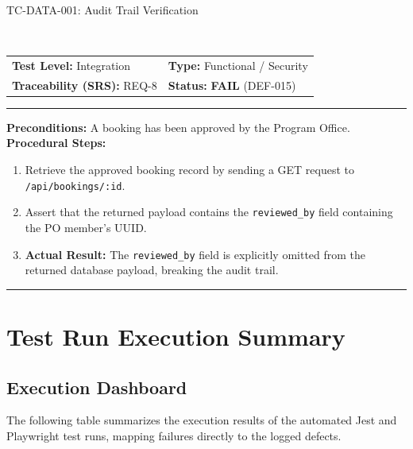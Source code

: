 \documentclass[11pt,a4paper]{article}
\makeatletter
\newcommand{\ieeetestcase}[8]{%
    \needspace{8\baselineskip}
    \noindent\colorbox{primaryblue}{\parbox{\dimexpr\textwidth-2\fboxsep\relax}{
        \color{white}\bfseries\large\strut #1: #2
    }}
    \nopagebreak\\
    \noindent\begin{tabularx}{\textwidth}{@{}X X@{}}
        \textbf{Test Level:} #3 & \textbf{Type:} #4 \\
        \textbf{Traceability (SRS):} #5 & \textbf{Status:} #6 \\
    \end{tabularx}
    \nopagebreak\vspace{0.1cm}
    \nopagebreak\hrule\vspace{0.2cm}
    \noindent\textbf{Preconditions:} #7 \\
    \noindent\textbf{Procedural Steps:}
    \begin{enumerate}[noitemsep,topsep=1pt,leftmargin=0.5cm]
        #8
    \end{enumerate}
    \vspace{0.4cm}\hrule\vspace{0.4cm}
}
\makeatother
\begin{document}
\ieeetestcase{TC-DATA-001}{Audit Trail Verification}{Integration}{Functional / Security}{REQ-8}{\textbf{FAIL} (DEF-015)}{A booking has been approved by the Program Office.}{
    \item Retrieve the approved booking record by sending a GET request to \texttt{/api/bookings/:id}.
    \item Assert that the returned payload contains the \texttt{reviewed\_by} field containing the PO member's UUID.
    \item \textbf{Actual Result:} The \texttt{reviewed\_by} field is explicitly omitted from the returned database payload, breaking the audit trail.
}

\newpage
\section{Test Run Execution Summary}

\subsection{Execution Dashboard}
The following table summarizes the execution results of the automated Jest and Playwright test runs, mapping failures directly to the logged defects.
\end{document}
